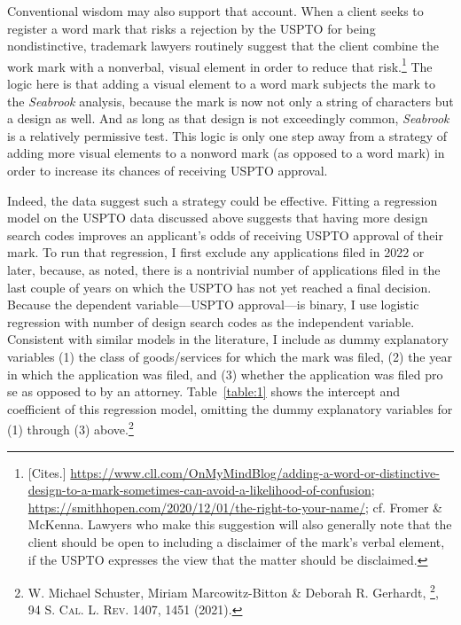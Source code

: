 \documentclass[letterpaper, 11pt, oneside]{article}
\begin{document}
Conventional wisdom may also support that account. When a client seeks to register a word mark that risks a rejection by the USPTO for being nondistinctive, trademark lawyers routinely suggest that the client combine the work mark with a nonverbal, visual element in order to reduce that risk.\footnote{[Cites.] \url{https://www.cll.com/OnMyMindBlog/adding-a-word-or-distinctive-design-to-a-mark-sometimes-can-avoid-a-likelihood-of-confusion}; \url{https://smithhopen.com/2020/12/01/the-right-to-your-name/}; cf. Fromer \& McKenna. Lawyers who make this suggestion will also generally note that the client should be open to including a disclaimer of the mark's verbal element, if the USPTO expresses the view that the matter should be disclaimed.} The logic here is that adding a visual element to a word mark subjects the mark to the \textit{Seabrook} analysis, because the mark is now not only a string of characters but a design as well. And as long as that design is not exceedingly common, \textit{Seabrook} is a relatively permissive test. This logic is only one step away from a strategy of adding more visual elements to a nonword mark (as opposed to a word mark) in order to increase its chances of receiving USPTO approval.

Indeed, the data suggest such a strategy could be effective. Fitting a regression model on the USPTO data discussed above suggests that having more design search codes improves an applicant's odds of receiving USPTO approval of their mark. To run that regression, I first exclude any applications filed in 2022 or later, because, as noted, there is a nontrivial number of applications filed in the last couple of years on which the USPTO has not yet reached a final decision. Because the dependent variable—USPTO approval—is binary, I use logistic regression with number of design search codes as the independent variable. Consistent with similar models in the literature, I include as dummy explanatory variables (1) the class of goods/services for which the mark was filed, (2) the year in which the application was filed, and (3) whether the application was filed pro se as opposed to by an attorney. Table~\ref{table:1} shows the intercept and coefficient of this regression model, omitting the dummy explanatory variables for (1) through (3) above.\footnote{W. Michael Schuster, Miriam Marcowitz-Bitton \& Deborah R. Gerhardt, \footnote{An Empirical Study of Gender and Race in Trademark Prosecution}, 94 \textsc{S. Cal. L. Rev.} 1407, 1451 (2021).}

 \par
\end{document}
